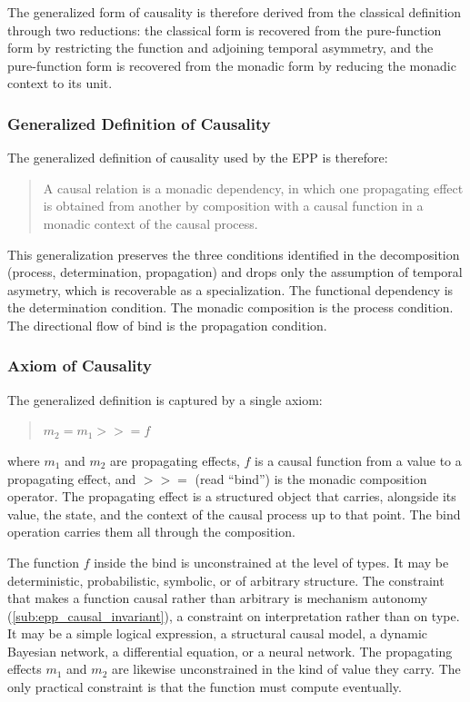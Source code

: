 The generalized form of causality is therefore derived from the classical definition through two reductions: the classical form is recovered from the pure-function form by restricting the function and adjoining temporal asymmetry, and the pure-function form is recovered from the monadic form by reducing the monadic context to its unit.

  
\subsubsection{Generalized Definition of Causality}
\label{sub:epp_general_def_causality}

The generalized definition of causality used by the EPP is therefore:
 
\begin{quote}
    A causal relation is a monadic dependency, in which one propagating effect is obtained from another by composition with a causal function in a monadic context of the causal process.
\end{quote}
 
This generalization preserves the three conditions identified in the decomposition (process, determination, propagation) and drops only the assumption of temporal asymetry, which is recoverable as a specialization. The functional dependency is the determination condition. The monadic composition is the process condition. The directional flow of bind is the propagation condition.

\subsubsection{Axiom of Causality}
\label{sub:epp_axiom_causality}


The generalized definition is captured by a single axiom:
 
\begin{quotation}
	\textbf{$m_{2} = m_{1} \mathbin{>\!\!>\!\!=} f$}
\end{quotation}
    
\noindent where $m_1$ and $m_2$ are propagating effects, $f$ is a causal function from a value to a propagating effect, and $\mathbin{>\!\!>\!\!=}$ (read ``bind'') is the monadic composition operator. The propagating effect is a structured object that carries, alongside its value, the state, and the context of the causal process up to that point. The bind operation carries them all through the composition.    
    
The function $f$ inside the bind is unconstrained at the level of types. It may be deterministic, probabilistic, symbolic, or of arbitrary structure. The constraint that makes a function causal rather than arbitrary is mechanism autonomy (\ref{sub:epp_causal_invariant}), a constraint on interpretation rather than on type. It may be a simple logical expression, a structural causal model, a dynamic Bayesian network, a differential equation, or a neural network. The propagating effects $m_1$ and $m_2$ are likewise unconstrained in the kind of value they carry. The only practical constraint is that the function must compute eventually.  
   
